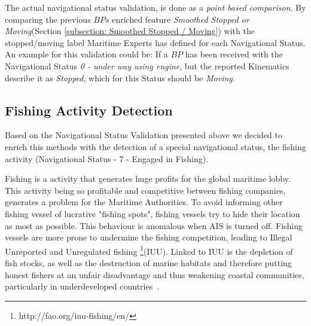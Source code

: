 The actual navigational status validation, is done as a \emph{point based comparison}. By comparing the previous $BPs$ enriched feature \emph{Smoothed Stopped or Moving}(Section \ref{subsection: Smoothed Stopped / Moving}) with the stopped/moving label Maritime Experts has defined for each Navigational Status.
An example for this validation could be:
If a $BP$ has been received with the Navigational Status \textit{0 - under way using engine}, but the reported Kinematics describe it as \textit{Stopped}, which for this Status should be \textit{Moving}.

\subsection{Fishing Activity Detection}
\label{subsection: Fishing Activity Detection}

Based on the Navigational Status Validation presented above we decided to enrich this methods with the detection of a special navigational status, the fishing activity (Navigational Status - 7 - Engaged in Fishing). 

Fishing is a activity that generates huge profits for the global maritime lobby. This activity being so profitable and competitive between fishing companies, generates a problem for the Maritime Authorities. To avoid informing other fishing vessel of lucrative "fishing spots", fishing vessels try to hide their location as most as possible. This behaviour is anomalous when AIS is turned off. Fishing vessels are more prone to undermine the fishing competition, leading to Illegal Unreported and Unregulated fishing \footnote{http://fao.org/iuu-fishing/en/}(IUU).  Linked to IUU is the depletion of fish stocks, as well as the destruction of marine habitats and therefore putting honest fishers at an unfair disadvantage and thus weakening coastal communities, particularly in underdeveloped countries~\cite{kroodsma2018TrackingFisheries}.

